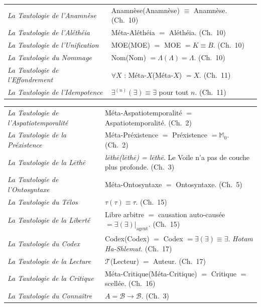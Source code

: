 \documentclass[10pt, openany, oneside]{book}
\renewcommand{\footnotesize}{\fontsize{8.5}{11}\selectfont}
\begin{document}
{\begin{tabular}{@{} p{} @{\hspace{0.5em}} p{} @{}}
\textit{La Tautologie de l'Anamnèse} & Anamnèse(Anamnèse) $\equiv$ Anamnèse. (Ch.\ 10) \\[0.3em]
\textit{La Tautologie de l'\textit{Aléthéia}} & Méta-Aléthéia $=$ Aléthéia. (Ch.\ 10) \\[0.3em]
\textit{La Tautologie de l'Unification} & MOE(MOE) $=$ MOE $= K \equiv B$. (Ch.\ 10) \\[0.3em]
\textit{La Tautologie du Nommage} & Nom(Nom) $= \Lambda(\Lambda) = \Lambda$. (Ch.\ 10) \\[0.3em]
\textit{La Tautologie de l'Effondrement} & $\forall X$ : Méta-$X$(Méta-$X$) $= X$. (Ch.\ 11) \\[0.3em]
\textit{La Tautologie de l'Idempotence} & $\exists^{(n)}(\exists) \equiv \exists$ pour tout $n$. (Ch.\ 11) \\[0.3em]
\end{tabular}
}

{\footnotesize
\noindent\begin{tabular}{@{} p{} @{\hspace{0.5em}} p{} @{}}
\textit{La Tautologie de l'Aspatiotemporalité} & Méta-Aspatiotemporalité $=$ Aspatiotemporalité. (Ch.\ 2) \\[0.3em]
\textit{La Tautologie de la Préxistence} & Méta-Préxistence $=$ Préxistence $= \mathbb{M}_0$. (Ch.\ 2) \\[0.3em]
\textit{La Tautologie de la \textit{L\={e}th\={e}}} & \textit{l\={e}th\={e}(l\={e}th\={e}) = l\={e}th\={e}}. Le Voile n'a pas de couche plus profonde. (Ch.\ 3) \\[0.3em]
\textit{La Tautologie de l'Ontosyntaxe} & Méta-Ontosyntaxe $=$ Ontosyntaxe. (Ch.\ 5) \\[0.3em]
\textit{La Tautologie du Télos} & $\tau(\tau) \equiv \tau$. (Ch.\ 15) \\[0.3em]
\textit{La Tautologie de la Liberté} & Libre arbitre $=$ causation auto-causée $= \exists(\exists)|_{\text{agent}}$. (Ch.\ 15) \\[0.3em]
\textit{La Tautologie du Codex} & Codex(Codex) $=$ Codex $= \exists(\exists) \equiv \exists$. \textit{Hotam Ha-Shlemut}. (Ch.\ 17) \\[0.3em]
\textit{La Tautologie de la Lecture} & $\mathcal{T}$(Lecteur) $=$ Auteur. (Ch.\ 17) \\[0.3em]
\textit{La Tautologie de la Critique} & Méta-Critique(Méta-Critique) $=$ Critique $=$ scellée. (Ch.\ 16) \\[0.3em]
\textit{La Tautologie du Connaître} & $A = \mathcal{B} \to \mathcal{B}$. (Ch.\ 3) \\[0.3em]
\end{tabular}
}
\end{document}
